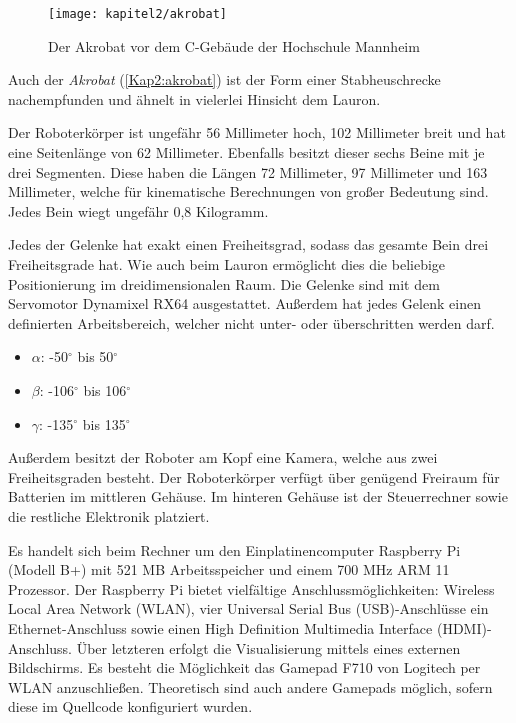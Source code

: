 \begin{figure}[b!]
  \centering
  \texttt{[image: kapitel2/akrobat]}
  \caption{Der Akrobat vor dem C-Gebäude der Hochschule Mannheim}
  \label{Kap2:akrobat}
\end{figure}

Auch der \emph{Akrobat} (\autoref{Kap2:akrobat}) ist der Form einer Stabheuschrecke nachempfunden und ähnelt in vielerlei Hinsicht dem Lauron.

Der Roboterkörper ist ungefähr 56 Millimeter hoch, 102 Millimeter breit und hat eine Seitenlänge von 62 Millimeter. Ebenfalls besitzt dieser sechs Beine mit je drei Segmenten. Diese haben die Längen 72 Millimeter, 97 Millimeter und 163 Millimeter, welche für kinematische Berechnungen von großer Bedeutung sind. Jedes Bein wiegt ungefähr 0,8 Kilogramm.

Jedes der Gelenke hat exakt einen Freiheitsgrad, sodass das gesamte Bein drei Freiheitsgrade hat. Wie auch beim Lauron ermöglicht dies die beliebige Positionierung im dreidimensionalen Raum. Die Gelenke sind mit dem Servomotor Dynamixel RX64 ausgestattet. Außerdem hat jedes Gelenk einen definierten Arbeitsbereich, welcher nicht unter- oder überschritten werden darf.
\begin{itemize}
  \item $\alpha$: -50$^\circ$ bis 50$^\circ$
  \item $\beta$: -106$^\circ$ bis 106$^\circ$
  \item $\gamma$: -135$^\circ$ bis 135$^\circ$
\end{itemize}  

Außerdem besitzt der Roboter am Kopf eine Kamera, welche aus zwei Freiheitsgraden besteht. Der Roboterkörper verfügt über genügend Freiraum für Batterien im mittleren Gehäuse. Im hinteren Gehäuse ist der Steuerrechner sowie die restliche Elektronik platziert.

Es handelt sich beim Rechner um den Einplatinencomputer Raspberry Pi (Modell B+) mit 521 MB Arbeitsspeicher und einem 700 MHz ARM 11 Prozessor. Der Raspberry Pi bietet vielfältige Anschlussmöglichkeiten: Wireless Local Area Network (WLAN), vier Universal Serial Bus (USB)-Anschlüsse ein Ethernet-Anschluss sowie einen High Definition Multimedia Interface (HDMI)-Anschluss. Über letzteren erfolgt die Visualisierung mittels eines externen Bildschirms. Es besteht die Möglichkeit das Gamepad F710 von Logitech per WLAN anzuschließen. Theoretisch sind auch andere Gamepads möglich, sofern diese im Quellcode konfiguriert wurden. \autocite{askerow2014}

